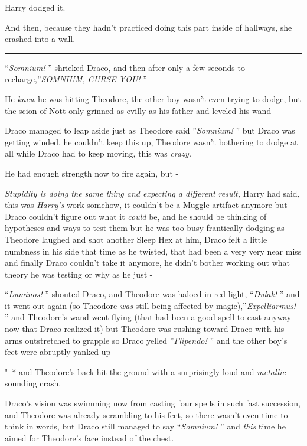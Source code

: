 Harry dodged it.

And then, because they hadn't practiced doing this part inside of
hallways, she crashed into a wall.

\begin{center}\rule{3in}{0.4pt}\end{center}

``\emph{Somnium!} '' shrieked Draco, and then after only a few seconds to
recharge,''\emph{SOMNIUM, CURSE YOU!} ''

He \emph{knew} he was hitting Theodore, the other boy wasn't even trying
to dodge, but the scion of Nott only grinned as evilly as his father and
leveled his wand -

Draco managed to leap aside just as Theodore said ''\emph{Somnium!} '' but
Draco was getting winded, he couldn't keep this up, Theodore wasn't
bothering to dodge at all while Draco had to keep moving, this was
\emph{crazy.}

He had enough strength now to fire again, but -

\emph{Stupidity is doing the same thing and expecting a different
result,} Harry had said, this was \emph{Harry's} work somehow, it
couldn't be a Muggle artifact anymore but Draco couldn't figure out what
it \emph{could} be, and he should be thinking of hypotheses and ways to
test them but he was too busy frantically dodging as Theodore laughed
and shot another Sleep Hex at him, Draco felt a little numbness in his
side that time as he twisted, that had been a very very near miss and
finally Draco couldn't take it anymore, he didn't bother working out
what theory he was testing or why as he just -

``\emph{Luminos!} '' shouted Draco, and Theodore was haloed in red light,
``\emph{Dulak!} '' and it went out again (so Theodore \emph{was} still
being affected by magic),''\emph{Expelliarmus!} '' and Theodore's wand
went flying (that had been a good spell to cast anyway now that Draco
realized it) but Theodore was rushing toward Draco with his arms
outstretched to grapple so Draco yelled ''\emph{Flipendo!} '' and the
other boy's feet were abruptly yanked up -

"--* and Theodore's back hit the ground with a surprisingly loud and
\emph{metallic}-sounding crash.

Draco's vision was swimming now from casting four spells in such fast
succession, and Theodore was already scrambling to his feet, so there
wasn't even time to think in words, but Draco still managed to say
``\emph{Somnium!} '' and \emph{this} time he aimed for Theodore's face
instead of the chest.

